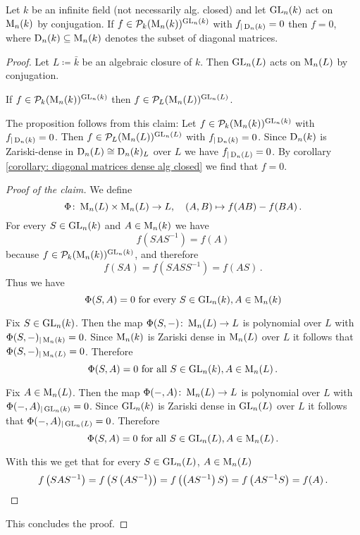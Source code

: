 \begin{proposition}
  Let $k$ be an infinite field (not necessarily alg. closed) and let $\operatorname{GL}_n(k)$ act on $\operatorname{M}_n(k)$ by conjugation.
  If $f \in \mathcal{P}_k(\operatorname{M}_n(k))^{\operatorname{GL}_n(k)}$ with $f_{|\operatorname{D}_n(k)} = 0$ then $f = 0$, where $\operatorname{D}_n(k) \subseteq \operatorname{M}_n(k)$ denotes the subset of diagonal matrices.
\end{proposition}
\begin{proof}
  Let $L \coloneqq \bar{k}$ be an algebraic closure of $k$.
  Then $\operatorname{GL}_n(L)$ acts on $\operatorname{M}_n(L)$ by conjugation.
  
  \begin{claim}
    If $f \in \mathcal{P}_k(\operatorname{M}_n(k))^{\operatorname{GL}_n(k)}$ then $f \in \mathcal{P}_L(\operatorname{M}_n(L))^{\operatorname{GL}_n(L)}$.
  \end{claim}
  
  The proposition follows from this claim:
  Let $f \in \mathcal{P}_k(\operatorname{M}_n(k))^{\operatorname{GL}_n(k)}$ with $f_{|\operatorname{D}_n(k)} = 0$.
  Then $f \in \mathcal{P}_L(\operatorname{M}_n(L))^{\operatorname{GL}_n(L)}$ with $f_{|\operatorname{D}_n(k)} = 0$.
  Since $\operatorname{D}_n(k)$ is Zariski-dense in $\operatorname{D}_n(L) \cong \operatorname{D}_n(k)_L$ over $L$ we have $f_{|\operatorname{D}_n(L)} = 0$.
  By corollary \ref{corollary: diagonal matrices dense alg closed} we find that $f = 0$.
  
  \begin{proof}[Proof of the claim]
    We define
    \[
              \Phi
      \colon  \operatorname{M}_n(L) \times \operatorname{M}_n(L)
      \to     L,
      \quad   (A,B)
      \mapsto f(AB)-f(BA) \,.
    \]
    For every $S \in \operatorname{GL}_n(k)$ and $A \in \operatorname{M}_n(k)$ we have
    \[
        f\left( SAS^{-1} \right)
      = f(A)
    \]
    because $f \in \mathcal{P}_k(\operatorname{M}_n(k))^{\operatorname{GL}_n(k)}$, and therefore
    \[
        f(SA)
      = f\left (SASS^{-1} \right)
      = f(AS) \,.
    \]
    Thus we have
    \[
        \Phi(S,A)
      = 0
      \text{ for every }
      S \in \operatorname{GL}_n(k),
      A \in \operatorname{M}_n(k)
    \]
    
    Fix $S \in \operatorname{GL}_n(k)$.
    Then the map $\Phi(S, -) \colon \operatorname{M}_n(L) \to L$ is polynomial over $L$ with $\Phi(S,-)_{|\operatorname{M}_n(k)} = 0$.
    Since $\operatorname{M}_n(k)$ is Zariski dense in $\operatorname{M}_n(L)$ over $L$ it follows that $\Phi(S,-)_{|\operatorname{M}_n(L)} = 0$.
    Therefore
    \[
        \Phi(S,A)
      = 0
      \text{ for all }
      S \in \operatorname{GL}_n(k),
      A \in \operatorname{M}_n(L) \,.
    \]
    
    Fix $A \in \operatorname{M}_n(L)$.
    Then the map $\Phi(-,A) \colon \operatorname{M}_n(L) \to L$ is polynomial over $L$ with $\Phi(-,A)_{|\operatorname{GL}_n(k)} = 0$.
    Since $\operatorname{GL}_n(k)$ is Zariski dense in $\operatorname{GL}_n(L)$ over $L$ it follows that $\Phi(-,A)_{|\operatorname{GL}_n(L)} = 0$.
    Therefore
    \[
        \Phi(S,A)
      = 0
      \text{ for all }
      S \in \operatorname{GL}_n(L),
      A \in \operatorname{M}_n(L) \,.
    \]
    
    With this we get that for every $S \in \operatorname{GL}_n(L)$, $A \in \operatorname{M}_n(L)$
    \[
        f\left( SAS^{-1} \right)
      = f\left( S \left( AS^{-1} \right) \right)
      = f\left( \left( AS^{-1} \right) S \right)
      = f\left( AS^{-1}S \right)
      = f(A) \,.
      \qedhere
    \]
  \end{proof}
  
  This concludes the proof.
\end{proof}
